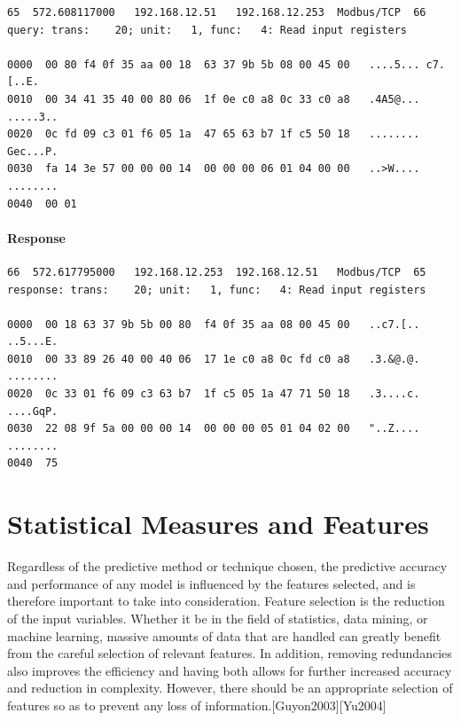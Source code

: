 \documentclass[12pt,]{article}
\begin{document}
\begin{verbatim}
65  572.608117000   192.168.12.51   192.168.12.253  Modbus/TCP  66
query: trans:    20; unit:   1, func:   4: Read input registers

0000  00 80 f4 0f 35 aa 00 18  63 37 9b 5b 08 00 45 00   ....5... c7.[..E.
0010  00 34 41 35 40 00 80 06  1f 0e c0 a8 0c 33 c0 a8   .4A5@... .....3..
0020  0c fd 09 c3 01 f6 05 1a  47 65 63 b7 1f c5 50 18   ........ Gec...P.
0030  fa 14 3e 57 00 00 00 14  00 00 00 06 01 04 00 00   ..>W.... ........
0040  00 01    
\end{verbatim}

\paragraph{Response}\label{response}

\begin{verbatim}
66  572.617795000   192.168.12.253  192.168.12.51   Modbus/TCP  65
response: trans:    20; unit:   1, func:   4: Read input registers

0000  00 18 63 37 9b 5b 00 80  f4 0f 35 aa 08 00 45 00   ..c7.[.. ..5...E.
0010  00 33 89 26 40 00 40 06  17 1e c0 a8 0c fd c0 a8   .3.&@.@. ........
0020  0c 33 01 f6 09 c3 63 b7  1f c5 05 1a 47 71 50 18   .3....c. ....GqP.
0030  22 08 9f 5a 00 00 00 14  00 00 00 05 01 04 02 00   "..Z.... ........
0040  75
\end{verbatim}

\pagebreak

\section{Statistical Measures and
Features}\label{statistical-measures-and-features}

Regardless of the predictive method or technique chosen, the predictive
accuracy and performance of any model is influenced by the features
selected, and is therefore important to take into consideration. Feature
selection is the reduction of the input variables. Whether it be in the
field of statistics, data mining, or machine learning, massive amounts
of data that are handled can greatly benefit from the careful selection
of relevant features. In addition, removing redundancies also improves
the efficiency and having both allows for further increased accuracy and
reduction in complexity. However, there should be an appropriate
selection of features so as to prevent any loss of
information.{[}Guyon2003{]}{[}Yu2004{]}
\end{document}
